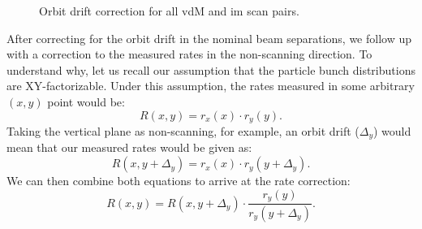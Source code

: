 \begin{itemize}
	\begin{figure}[!htb]
		\centering
		\caption[Orbit drift correction summary]{Orbit drift correction for all vdM and im scan pairs.}
		\label{fig:linear_orbit_drift_correction}
	\end{figure}

	After correcting for the orbit drift in the nominal beam separations, we follow up with a correction to the measured rates in the non-scanning direction. To understand why, let us recall our assumption that the particle bunch distributions are XY-factorizable. Under this assumption, the rates measured in some arbitrary $(x, y)$ point would be:
	\begin{equation}
		R\left( x, y \right) = r_x(x) \cdot r_y(y).
	\end{equation}
	Taking the vertical plane as non-scanning, for example, an orbit drift ($\Delta_y$) would mean that our measured rates would be given as:
	\begin{equation}
		R\left( x, y + \Delta_y \right) = r_x(x) \cdot r_y(y + \Delta_y).
	\end{equation}
	We can then combine both equations to arrive at the rate correction:
	\begin{equation}
		R\left( x, y\right) = R\left( x, y + \Delta_y \right) \cdot \frac{r_y(y)}{r_y(y + \Delta_y)}.
	\end{equation}


\end{itemize}
